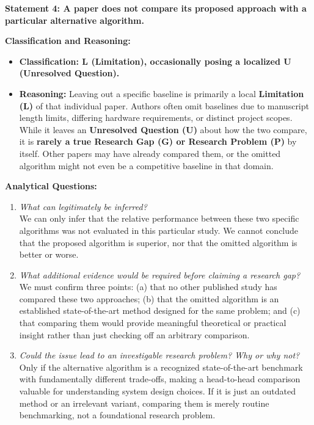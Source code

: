 \documentclass[11pt]{article}
\newcommand{\qLabel}[1]{
    {\fontsize{12}{14.4}\selectfont \textbf{#1}}
}
\begin{document}
\vspace{1.2em}




\newpage
\qLabel{Statement 4: A paper does not compare its proposed approach with a particular alternative algorithm.}
\vspace{0.4em}

\noindent\textbf{Classification and Reasoning:}
\begin{itemize}[leftmargin=1.5em]
    \item \textbf{Classification: L (Limitation), occasionally posing a localized U (Unresolved Question).}
    \item \textbf{Reasoning:} Leaving out a specific baseline is primarily a local \textbf{Limitation (L)} of that individual paper. Authors often omit baselines due to manuscript length limits, differing hardware requirements, or distinct project scopes. While it leaves an \textbf{Unresolved Question (U)} about how the two compare, it is \textbf{rarely a true Research Gap (G) or Research Problem (P)} by itself. Other papers may have already compared them, or the omitted algorithm might not even be a competitive baseline in that domain.
\end{itemize}

\noindent\textbf{Analytical Questions:}
\begin{enumerate}[leftmargin=1.5em]
    \item \textit{What can legitimately be inferred?} \\
    We can only infer that the relative performance between these two specific algorithms was not evaluated in this particular study. We cannot conclude that the proposed algorithm is superior, nor that the omitted algorithm is better or worse.
    \item \textit{What additional evidence would be required before claiming a research gap?} \\
    We must confirm three points: (a) that no other published study has compared these two approaches; (b) that the omitted algorithm is an established state-of-the-art method designed for the same problem; and (c) that comparing them would provide meaningful theoretical or practical insight rather than just checking off an arbitrary comparison.
    \item \textit{Could the issue lead to an investigable research problem? Why or why not?} \\
    Only if the alternative algorithm is a recognized state-of-the-art benchmark with fundamentally different trade-offs, making a head-to-head comparison valuable for understanding system design choices. If it is just an outdated method or an irrelevant variant, comparing them is merely routine benchmarking, not a foundational research problem.
\end{enumerate}
\end{document}
